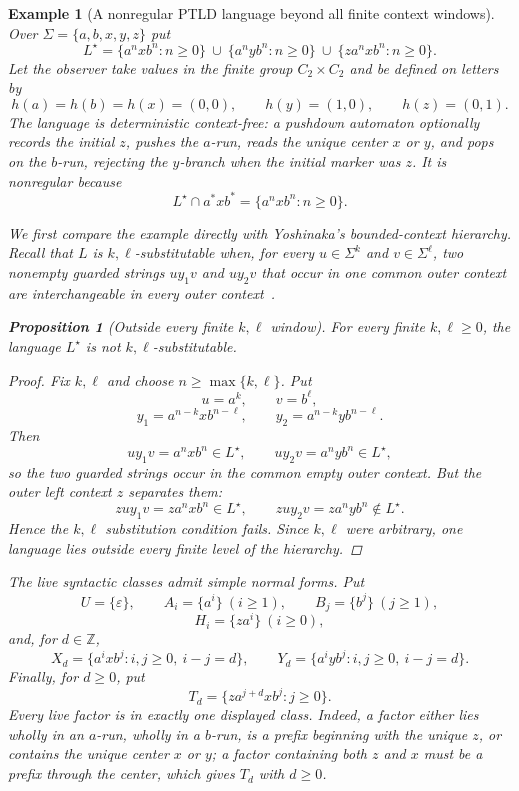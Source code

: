 \documentclass[11pt,a4paper]{article}
\newtheorem{proposition}[theorem]{Proposition}
\newtheorem{example}[theorem]{Example}
\newcommand{\eps}{\varepsilon}
\begin{document}
\begin{example}[A nonregular PTLD language beyond all finite context windows]
\label{ex:Lstar}
Over $\Sigma=\{a,b,x,y,z\}$ put
\[
L^\star
=
\{a^nxb^n:n\ge0\}
\ \cup\
\{a^nyb^n:n\ge0\}
\ \cup\
\{za^nxb^n:n\ge0\}.
\]
Let the observer take values in the finite group $C_2\times C_2$ and be defined on letters by
\[
h(a)=h(b)=h(x)=(0,0),\qquad
h(y)=(1,0),\qquad
h(z)=(0,1).
\]
The language is deterministic context-free: a pushdown automaton optionally records the initial $z$, pushes the $a$-run, reads the unique center $x$ or $y$, and pops on the $b$-run, rejecting the $y$-branch when the initial marker was $z$.  It is nonregular because
\[
L^\star\cap a^*xb^*=\{a^nxb^n:n\ge0\}.
\]

We first compare the example directly with Yoshinaka's bounded-context hierarchy.  Recall that $L$ is $k,\ell$-substitutable when, for every $u\in\Sigma^k$ and $v\in\Sigma^\ell$, two nonempty guarded strings $uy_1v$ and $uy_2v$ that occur in one common outer context are interchangeable in every outer context~\cite{Yoshinaka2008}.

\begin{proposition}[Outside every finite $k,\ell$ window]
\label{prop:Lstar-not-kl}
For every finite $k,\ell\ge0$, the language $L^\star$ is not $k,\ell$-substitutable.
\end{proposition}

\begin{proof}
Fix $k,\ell$ and choose $n\ge\max\{k,\ell\}$.  Put
\[
u=a^k,\qquad v=b^\ell,
\]
\[
y_1=a^{n-k}xb^{n-\ell},\qquad
y_2=a^{n-k}yb^{n-\ell}.
\]
Then
\[
uy_1v=a^nxb^n\in L^\star,
\qquad
uy_2v=a^nyb^n\in L^\star,
\]
so the two guarded strings occur in the common empty outer context.  But the outer left context $z$ separates them:
\[
zuy_1v=za^nxb^n\in L^\star,
\qquad
zuy_2v=za^nyb^n\notin L^\star.
\]
Hence the $k,\ell$ substitution condition fails.  Since $k,\ell$ were arbitrary, one language lies outside every finite level of the hierarchy.
\end{proof}

The live syntactic classes admit simple normal forms.  Put
\[
U=\{\eps\},\qquad
A_i=\{a^i\}\ (i\ge1),\qquad
B_j=\{b^j\}\ (j\ge1),
\]
\[
H_i=\{za^i\}\ (i\ge0),
\]
and, for $d\in\mathbb Z$,
\[
X_d=\{a^ixb^j:i,j\ge0,\ i-j=d\},
\qquad
Y_d=\{a^iyb^j:i,j\ge0,\ i-j=d\}.
\]
Finally, for $d\ge0$, put
\[
T_d=\{za^{j+d}xb^j:j\ge0\}.
\]
Every live factor is in exactly one displayed class.  Indeed, a factor either lies wholly in an $a$-run, wholly in a $b$-run, is a prefix beginning with the unique $z$, or contains the unique center $x$ or $y$; a factor containing both $z$ and $x$ must be a prefix through the center, which gives $T_d$ with $d\ge0$.


\end{example}
\end{document}
